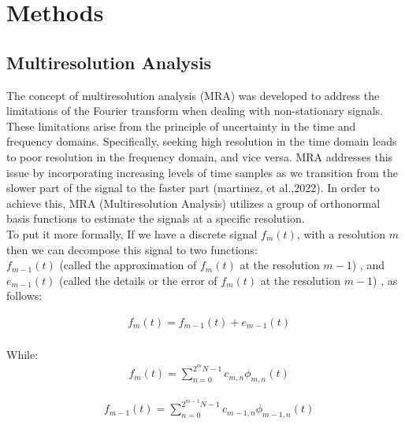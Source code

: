 \documentclass{svproc}
\begin{document}
\section{Methods}
\subsection{Multiresolution Analysis}
The concept of multiresolution analysis (MRA) was developed to address the
limitations of the Fourier transform when dealing with non-stationary signals.
These limitations arise from the principle of uncertainty in the time and
frequency domains. Specifically, seeking high resolution in the time domain
leads to poor resolution in the frequency domain, and vice versa. MRA addresses
this issue by incorporating increasing levels of time samples as we transition
from the slower part of the signal to the faster part (martinez, et al.,2022)\cite{martinez2022applications}.
In order to achieve this, MRA (Multiresolution Analysis) utilizes a group of
orthonormal basis functions to estimate the signals at a specific resolution.\\

To put it more formally, If we have a discrete signal $f_m(t)$, with a resolution $m$
then we can decompose this signal to two functions:\\ $f_{m-1}(t)$ (called the approximation of $f_m(t)$ at the resolution $m-1$)
, and\\ $e_{m-1}(t)$ (called the details or the error of $f_m(t)$ at the resolution $m-1$) , as follows:


\begin{equation}
  \begin{aligned}
     & f_m(t)=f_{m-1}(t)+ e_{m-1}(t)
  \end{aligned}
  \label{eq:eq1}
\end{equation}\\

While:
\begin{equation}
  \begin{aligned}
     & f_m(t)=\sum_{n=0}^{2^m N-1} c_{m, n} \phi_{m, n}(t)
  \end{aligned}
  \label{eq:eq2}
\end{equation}

\begin{equation}
    \begin{aligned}
       & f_{m-1}(t)=\sum_{n=0}^{2^{m-1} N-1} c_{{m-1}, n} \phi_{{m-1}, n}(t)
    \end{aligned}
    \label{eq:eq3}
  \end{equation}
\end{document}

